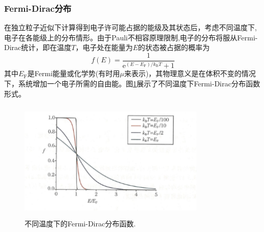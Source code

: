\subsubsection{Fermi-Dirac分布} 
在独立粒子近似下计算得到电子许可能占据的能级及其状态后，考虑不同温度下,电子在各能级上的分布情形。由于Pauli不相容原理限制,电子的分布将服从Fermi-Dirac统计，即在温度$T$，电子处在能量为$E$的状态被占据的概率为
\begin{equation}
	f(E)=\dfrac1{\mathrm{e}^{(E-E_{\mathrm{F}})/k_{\mathrm{B}}T}+1}
	\label{eq:Fermi_Dirac}
\end{equation}
其中$E_{\mathrm{F}}$是Fermi能量或化学势(有时用$\mu$来表示)，其物理意义是在体积不变的情况下，系统增加一个电子所需的自由能。图\ref{Fig:Fermi-Dirac}展示了不同温度下Fermi-Dirac分布函数形式。
\begin{figure}[h!]
\centering
\vspace*{-0.10in}
\includegraphics[height=2.25in,width=3.5in,viewport=0 0 70 45,clip]{Figures/Fermi-Dirac.png}
\caption{\small \textrm{不同温度下的Fermi-Dirac分布函数.}}%
\label{Fig:Fermi-Dirac}
\end{figure}
